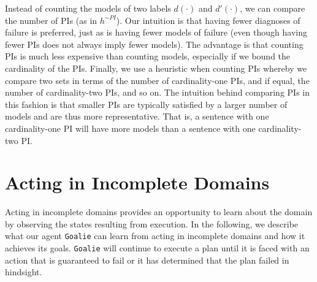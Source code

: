 \documentclass[letterpaper]{article}
\def\goalie{{\tt Goalie}}
\begin{document}
Instead of counting the models of two labels $d(\cdot)$ and $d'(\cdot)$, we can
compare the number of PIs (as in $h^{\sim PI}$).  Our intuition is that having
fewer diagnoses of failure is preferred, just as is having fewer models of failure (even though
having fewer PIs does not always imply fewer models).  The advantage is that
counting PIs is much less expensive than counting models, especially if we bound
the cardinality of the PIs.  Finally, we use a heuristic when counting PIs
whereby we compare two sets in terms of the number of cardinality-one PIs, and
if equal, the number of cardinality-two PIs, and so on.  The intuition behind
comparing PIs in this fashion is that smaller PIs are typically satisfied by a
larger number of models and are thus more representative.  That is, a sentence
with one cardinality-one PI will have more models than a sentence with one
cardinality-two PI.

\section{Acting in Incomplete Domains} Acting in incomplete domains provides an
opportunity to learn about the domain by observing the states resulting from
execution.  In the following, we describe what our agent \goalie{} can
learn from acting in incomplete domains and how it  achieves its goals.
\goalie{} will continue to execute a plan until it is faced with an action that
is guaranteed to fail or it has determined that the plan failed in hindsight.
\end{document}
